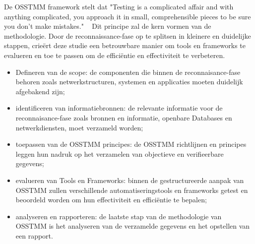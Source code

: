 De OSSTMM framework stelt dat "Testing is a complicated affair and with anything complicated, you approach it in small, comprehensible pieces to be sure you don’t make mistakes." ~\autocite{Herzog}
Dit principe zal de kern vormen van de methodologie. 
Door de reconnaissance-fase op te splitsen in kleinere en duidelijke stappen, crieërt deze studie een betrouwbare manier om tools en frameworks te evalueren en toe te passen om de efficiëntie en effectiviteit te verbeteren.

\begin{itemize}
    \item Defineren van de scope: 
    de componenten die binnen de reconnaisance-fase behoren zoals netwerkstructuren, systemen en applicaties moeten duidelijk afgebakend zijn;
    \item identificeren van informatiebronnen:
    de relevante informatie voor de reconnaisance-fase zoals bronnen en informatie, openbare Databases en netwerkdiensten, moet verzameld worden; 
    \item toepassen van de OSSTMM principes:
    de OSSTMM richtlijnen en principes leggen hun nadruk op het verzamelen van objectieve en verifieerbare gegevens;
    \item evalueren van Tools en Frameworks:
    binnen de gestructureerde aanpak van OSSTMM zullen verschillende automatiseringstools en frameworks getest en beoordeld worden om hun effectiviteit en efficiëntie te bepalen;
    \item analyseren en rapporteren:
    de laatste stap van de methodologie van OSSTMM is het analyseren van de verzamelde gegevens en het opstellen van een rapport.
\end{itemize}



